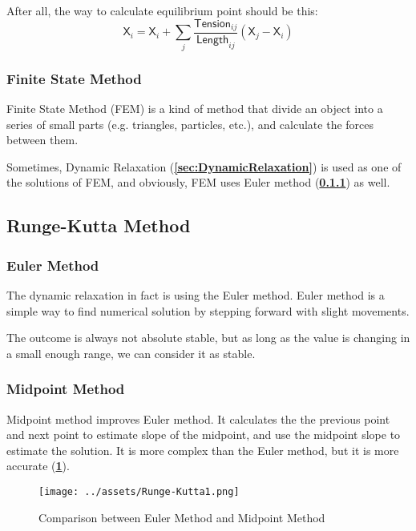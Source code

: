 \documentclass[a4paper, openany]{book}
\begin{document}
After all, the way to calculate equilibrium point should be this:
$$\mathsf{X}_i = \mathsf{X}_i + \sum_{j} \frac{\mathsf{Tension}_{ij}}{\mathsf{Length}_{ij}} (\mathsf{X}_j - \mathsf{X}_i)$$

\subsubsection{Finite State Method}\label{sec:FiniteStateMethod}

Finite State Method (FEM) is a kind of method that divide an object into a series of small parts (e.g. triangles, particles, etc.), and calculate the forces between them.

Sometimes, Dynamic Relaxation (\textbf{\cref{sec:DynamicRelaxation}}) is used as one of the solutions of FEM, and obviously, FEM uses Euler method (\textbf{\cref{sec:EulerMethod}}) as well.

\subsection{Runge-Kutta Method}\label{sec:RungeKuttaMethod}

\subsubsection{Euler Method}\label{sec:EulerMethod}

The dynamic relaxation in fact is using the Euler method. Euler method is a simple way to find numerical solution by stepping forward with slight movements.

The outcome is always not absolute stable, but as long as the value is changing in a small enough range, we can consider it as stable.

\subsubsection{Midpoint Method}\label{sec:MidpointMethod}

Midpoint method improves Euler method. It calculates the the previous point and next point to estimate slope of the midpoint, and use the midpoint slope to estimate the solution. It is more complex than the Euler method, but it is more accurate (\textbf{\cref{fig:RungeKutta1}}).

\begin{figure}[htbp]
  \centering
  \texttt{[image: ../assets/Runge-Kutta1.png]}
  \caption{Comparison between Euler Method and Midpoint Method}
  \label{fig:RungeKutta1}
\end{figure}
\end{document}
